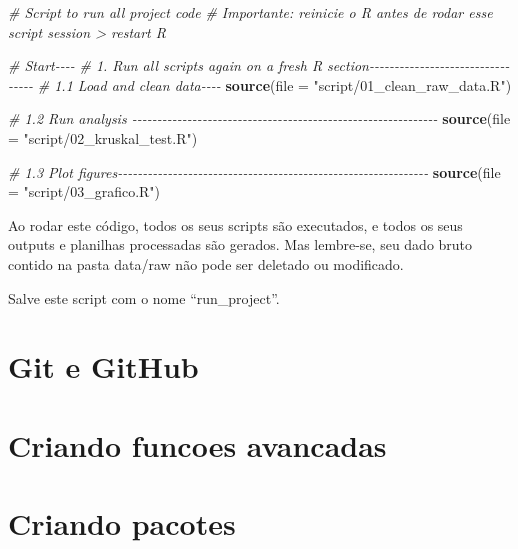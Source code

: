 \documentclass[
]{book}
\newenvironment{Shaded}{\begin{snugshade}}{\end{snugshade}}
\newcommand{\AttributeTok}[1]{\textcolor[rgb]{0.13,0.29,0.53}{#1}}
\newcommand{\CommentTok}[1]{\textcolor[rgb]{0.56,0.35,0.01}{\textit{#1}}}
\newcommand{\FunctionTok}[1]{\textcolor[rgb]{0.13,0.29,0.53}{\textbf{#1}}}
\newcommand{\NormalTok}[1]{#1}
\newcommand{\StringTok}[1]{\textcolor[rgb]{0.31,0.60,0.02}{#1}}
\begin{document}
\begin{Shaded}
\begin{Highlighting}[]
\CommentTok{\# Script to run all project code}
\CommentTok{\# Importante: reinicie o R antes de rodar esse script session \textgreater{} restart R}

\CommentTok{\# Start{-}{-}{-}{-}}
\CommentTok{\# 1. Run all scripts again on a fresh R section{-}{-}{-}{-}{-}{-}{-}{-}{-}{-}{-}{-}{-}{-}{-}{-}{-}{-}{-}{-}{-}{-}{-}{-}{-}{-}{-}{-}{-}{-}{-}{-}{-}}
\CommentTok{\# 1.1 Load and clean data{-}{-}{-}{-}}
\FunctionTok{source}\NormalTok{(}\AttributeTok{file =} \StringTok{"script/01\_clean\_raw\_data.R"}\NormalTok{)}

\CommentTok{\# 1.2 Run analysis {-}{-}{-}{-}{-}{-}{-}{-}{-}{-}{-}{-}{-}{-}{-}{-}{-}{-}{-}{-}{-}{-}{-}{-}{-}{-}{-}{-}{-}{-}{-}{-}{-}{-}{-}{-}{-}{-}{-}{-}{-}{-}{-}{-}{-}{-}{-}{-}{-}{-}{-}{-}{-}{-}{-}{-}{-}{-}{-}{-}{-}}
\FunctionTok{source}\NormalTok{(}\AttributeTok{file =} \StringTok{"script/02\_kruskal\_test.R"}\NormalTok{)}

\CommentTok{\# 1.3 Plot figures{-}{-}{-}{-}{-}{-}{-}{-}{-}{-}{-}{-}{-}{-}{-}{-}{-}{-}{-}{-}{-}{-}{-}{-}{-}{-}{-}{-}{-}{-}{-}{-}{-}{-}{-}{-}{-}{-}{-}{-}{-}{-}{-}{-}{-}{-}{-}{-}{-}{-}{-}{-}{-}{-}{-}{-}{-}{-}{-}{-}{-}{-}}
\FunctionTok{source}\NormalTok{(}\AttributeTok{file =} \StringTok{"script/03\_grafico.R"}\NormalTok{)}
\end{Highlighting}
\end{Shaded}

Ao rodar este código, todos os seus scripts são executados, e todos os seus outputs e planilhas processadas são gerados. Mas lembre-se, seu dado bruto contido na pasta data/raw não pode ser deletado ou modificado.

Salve este script com o nome ``run\_project''.

\hypertarget{git-e-github}{%
\chapter{Git e GitHub}\label{git-e-github}}

\hypertarget{criando-funcoes-avancadas}{%
\chapter{Criando funcoes avancadas}\label{criando-funcoes-avancadas}}

\hypertarget{criando-pacotes}{%
\chapter{Criando pacotes}\label{criando-pacotes}}

  
\end{document}
